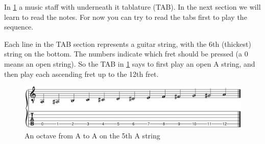 
In \ref{fig:guitar_string_a_octave} a music staff with underneath it tablature (TAB). In the next section we will learn to read the notes. For now you can try to read the tabs first to play the sequence.

Each line in the TAB section represents a guitar string, with the 6th (thickest) string on the bottom. The numbers indicate which fret should be pressed (a 0 means an open string). So the TAB in \ref{fig:guitar_string_a_octave} says to first play an open A string, and then play each ascending fret up to the 12th fret.

\begin{figure}[h]
    \centering
    \includegraphics[width=\textwidth]{../MuseScore/Guitar/PitchesSharps.png}
    \caption{An octave from A to A on the 5th A string}
    \label{fig:guitar_string_a_octave}
\end{figure}
